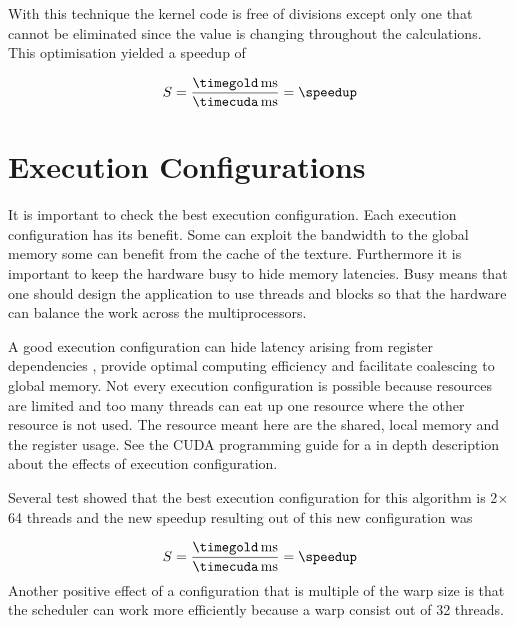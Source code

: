 With this technique the kernel code is free of divisions except only one that
cannot be eliminated since the value is changing throughout the calculations.
This optimisation yielded a speedup of

\fpDiv{\speedup}{\timegold}{\timecuda}
\begin{equation*}\label{eq:speedup3}
	S = \frac{\unit[\timegold]{ms}}{\unit[\timecuda]{ms}} = \speedup
\end{equation*}


\section{Execution Configurations} %
\label{sec:run_configurations}
It is important to check the best execution configuration. Each execution
configuration has its benefit. Some can exploit the bandwidth to the global
memory some can benefit from the cache of the texture. Furthermore it is
important to keep the hardware busy to hide memory latencies. Busy means that
one should design the application to use threads and blocks so that the
hardware can balance the work across the multiprocessors.

A good execution configuration can hide latency arising from register
dependencies , provide optimal computing efficiency and facilitate coalescing to
global memory. Not every execution configuration is possible because resources
are limited and too many threads can eat up one resource where the other resource
is not used. The resource meant here are the shared, local memory and the register
usage. See the \gls{CUDA} programming guide \citep{citeulike:3325943} for a in 
depth description about the effects of execution configuration.

Several test showed that the best execution configuration for this algorithm is
2$\times$64 threads and the new speedup  resulting out of this new configuration
was

\fpDiv{\speedup}{\timegold}{\timecuda}
\begin{equation*}\label{eq:speedup4}
	S = \frac{\unit[\timegold]{ms}}{\unit[\timecuda]{ms}} = \speedup
\end{equation*}
 Another positive effect of a configuration that is multiple of the warp size is
that the scheduler can work more efficiently because a warp consist out of 32 
threads. 

